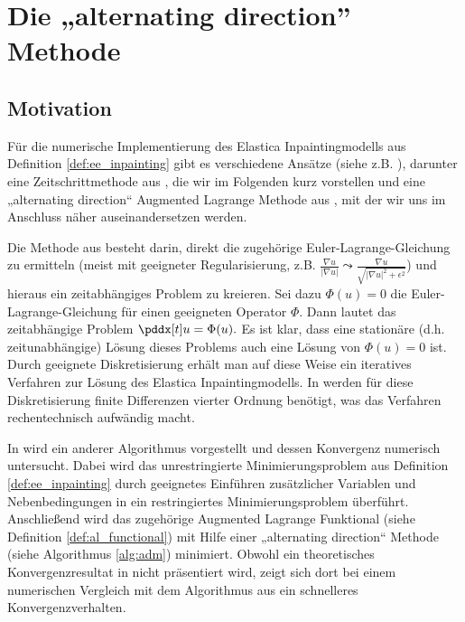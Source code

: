 \documentclass{mythesis}
\begin{document}
\chapter{Die „alternating direction” Methode} \label{chap:adm}


\section{Motivation} %


Für die numerische Implementierung des Elastica Inpaintingmodells aus Definition \ref{def:ee_inpainting} gibt es verschiedene Ansätze (siehe z.B. \cite{ballester2001filling,brito2010fast,shen2002euler,duan2013fast,hahn2011fast,tai2011fast,yashtini2015alternating}), darunter eine Zeitschrittmethode aus \cite{shen2002euler}, die wir im Folgenden kurz vorstellen und eine „alternating direction“ Augmented Lagrange Methode aus \cite{tai2011fast}, mit der wir uns im Anschluss näher auseinandersetzen werden.

Die Methode aus \cite{shen2002euler} besteht darin, direkt die zugehörige Euler-Lagrange-Gleichung zu ermitteln (meist mit geeigneter Regularisierung, z.B. $\frac{\nabla u}{|\nabla u|} \leadsto \frac{\nabla u}{\sqrt{|\nabla u|^2 + \epsilon^2}}$) und hieraus ein zeitabhängiges Problem zu kreieren.
Sei dazu $\Phi(u) = 0$ die Euler-Lagrange-Gleichung für einen geeigneten Operator $\Phi$.
Dann lautet das zeitabhängige Problem
\begin{math}
    \pddx[t] u = \Phi(u).
\end{math}
Es ist klar, dass eine stationäre (d.h. zeitunabhängige) Lösung dieses Problems auch eine Lösung von $\Phi(u) = 0$ ist.
Durch geeignete Diskretisierung erhält man auf diese Weise ein iteratives Verfahren zur Lösung des Elastica Inpaintingmodells.
In \cite{shen2002euler} werden für diese Diskretisierung finite Differenzen vierter Ordnung benötigt, was das Verfahren rechentechnisch aufwändig macht.

In \cite{tai2011fast} wird ein anderer Algorithmus vorgestellt und dessen Konvergenz numerisch untersucht.
Dabei wird das unrestringierte Minimierungsproblem aus Definition \ref{def:ee_inpainting} durch geeignetes Einführen zusätzlicher Variablen und Nebenbedingungen in ein restringiertes Minimierungsproblem überführt.
Anschließend wird das zugehörige Augmented Lagrange Funktional (siehe Definition \ref{def:al_functional}) mit Hilfe einer „alternating direction“ Methode (siehe Algorithmus \ref{alg:adm}) minimiert.
Obwohl ein theoretisches Konvergenzresultat in \cite{tai2011fast} nicht präsentiert wird, zeigt sich dort bei einem numerischen Vergleich mit dem Algorithmus aus \cite{shen2002euler} ein schnelleres Konvergenzverhalten.
\end{document}
